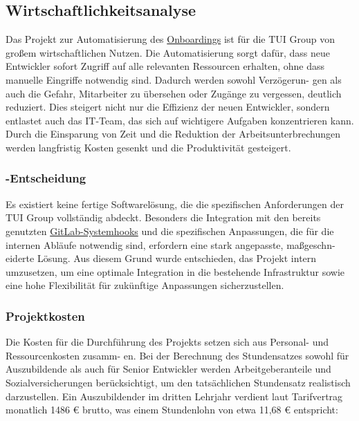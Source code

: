\subsection{Wirtschaftlichkeitsanalyse}
\label{sec:Wirtschaftlichkeitsanalyse}

Das Projekt zur Automatisierung des \hyperlink{Onboarding}{\textcolor{AOBlau}{Onboardings}} ist für die TUI Group von großem wirtschaftlichen Nutzen. Die Automatisierung sorgt dafür, dass neue Entwickler sofort Zugriff auf alle relevanten Ressourcen erhalten, ohne dass manuelle Eingriffe notwendig sind. Dadurch werden sowohl Verzögerun-
gen als auch die Gefahr, Mitarbeiter zu übersehen oder Zugänge zu vergessen, deutlich reduziert. Dies steigert nicht nur die Effizienz der neuen Entwickler, sondern entlastet auch das IT-Team, das sich auf wichtigere Aufgaben konzentrieren kann. Durch die Einsparung von Zeit und die Reduktion der Arbeitsunterbrechungen werden langfristig Kosten gesenkt und die Produktivität gesteigert.

\subsubsection{-Entscheidung}
\label{sec:MakeOrBuyEntscheidung}

Es existiert keine fertige Softwarelösung, die die spezifischen Anforderungen der TUI Group vollständig abdeckt. Besonders die Integration mit den bereits genutzten \hyperlink{GitLabSystemHooks}{\textcolor{AOBlau}{GitLab-Systemhooks}} und die spezifischen Anpassungen, die für die internen Abläufe notwendig sind, erfordern eine stark angepasste, maßgeschn-
eiderte Lösung. Aus diesem Grund wurde entschieden, das Projekt intern umzusetzen, um eine optimale Integration in die bestehende Infrastruktur sowie eine hohe Flexibilität für zukünftige Anpassungen sicherzustellen.

\subsubsection{Projektkosten}
\label{sec:Projektkosten}

Die Kosten für die Durchführung des Projekts setzen sich aus Personal- und Ressourcenkosten zusamm-
en. Bei der Berechnung des Stundensatzes sowohl für Auszubildende als auch für Senior Entwickler werden Arbeitgeberanteile und Sozialversicherungen berücksichtigt, um den tatsächlichen Stundensatz realistisch darzustellen.
\newline
Ein Auszubildender im dritten Lehrjahr verdient laut Tarifvertrag monatlich 1486 € brutto, was einem Stundenlohn von etwa 11,68 € entspricht:

